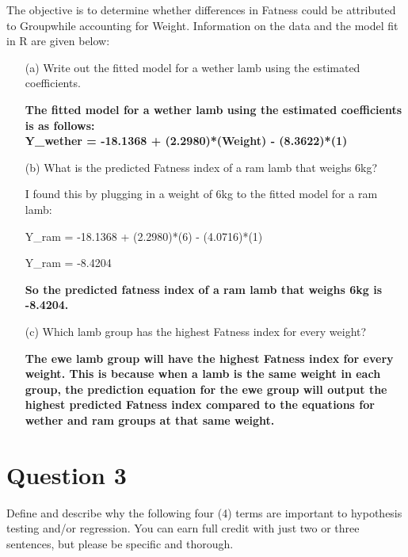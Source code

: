 \documentclass[12pt,letterpaper]{article}
\begin{document}
	The objective is to determine whether differences in Fatness could be attributed to Groupwhile accounting for Weight. Information on the data and the model fit in R are given below:

	\begin{enumerate}
		\item [(a)] Write out the fitted model for a wether lamb using the estimated coefficients.
		
		\textbf{The fitted model for a wether lamb using the estimated coefficients is as follows:
		\\
		Y\_wether = -18.1368 + (2.2980)*(Weight) - (8.3622)*(1)}
				
		\item [(b)] What is the predicted Fatness index of a ram lamb that weighs 6kg?
		
	I found this by plugging in a weight of 6kg to the fitted model for a ram lamb:
		
	Y\_ram = -18.1368 + (2.2980)*(6) - (4.0716)*(1)
		
	Y\_ram = -8.4204
		
\textbf{	So the predicted fatness index of a ram lamb that weighs 6kg is -8.4204.}
	
		
	\item [(c)] Which lamb group has the highest Fatness index for every weight?
		
		\textbf{The ewe lamb group will have the highest Fatness index for every weight. This is because when a lamb is the same weight in each group, the prediction equation for the ewe group will output the highest predicted Fatness index compared to the equations for wether and ram groups at that same weight.}
		
	\end{enumerate}  

\newpage

		\section*{Question 3}
		
	\vspace{.25cm}
	\noindent 
Define and describe why the following four (4) terms are important to hypothesis testing and/or regression. You can earn full credit with just two or three sentences, but please be specific and thorough.
	
\end{document}
